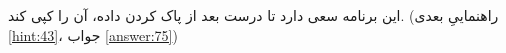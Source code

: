 \section{}
\paragraph{}\label{hint:317}
این برنامه سعی دارد تا درست بعد از پاک کردن داده، آن را کپی کند. (راهنماییِ بعدی \ref{hint:43}، جواب \ref{answer:75})